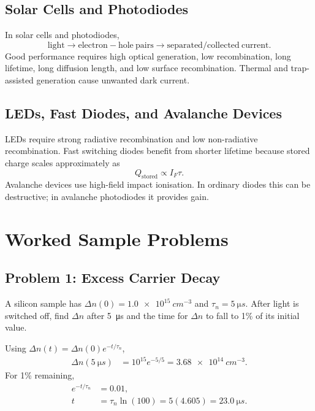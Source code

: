 \documentclass[11pt,a4paper]{article}
\newcommand{\dd}{\Delta}
\begin{document}
\subsection{Solar Cells and Photodiodes}

In solar cells and photodiodes,
\begin{equation}
  \mathrm{light}\rightarrow\mathrm{electron-hole\ pairs}\rightarrow
  \mathrm{separated/collected\ current}.
\end{equation}
Good performance requires high optical generation, low recombination, long lifetime, long diffusion length, and low surface recombination. Thermal and trap-assisted generation cause unwanted dark current.

\subsection{LEDs, Fast Diodes, and Avalanche Devices}

LEDs require strong radiative recombination and low non-radiative recombination. Fast switching diodes benefit from shorter lifetime because stored charge scales approximately as
\begin{equation}
  Q_{\mathrm{stored}}\propto I_F\tau .
\end{equation}
Avalanche devices use high-field impact ionisation. In ordinary diodes this can be destructive; in avalanche photodiodes it provides gain.

\section{Worked Sample Problems}

\subsection{Problem 1: Excess Carrier Decay}

\begin{tcolorbox}[title={Question}]
A silicon sample has \(\dd n(0)=\SI{1.0e15}{cm^{-3}}\) and \(\tau_n=\SI{5}{\micro s}\). After light is switched off, find \(\dd n\) after \SI{5}{\micro s} and the time for \(\dd n\) to fall to 1\% of its initial value.
\end{tcolorbox}

Using \(\dd n(t)=\dd n(0)e^{-t/\tau_n}\),
\begin{align}
  \dd n(\SI{5}{\micro s})
  &=10^{15}e^{-5/5}
  =\SI{3.68e14}{cm^{-3}}.
\end{align}
For 1\% remaining,
\begin{align}
  e^{-t/\tau_n}&=0.01,\\
  t&=\tau_n\ln(100)=5(4.605)=\SI{23.0}{\micro s}.
\end{align}
\end{document}
